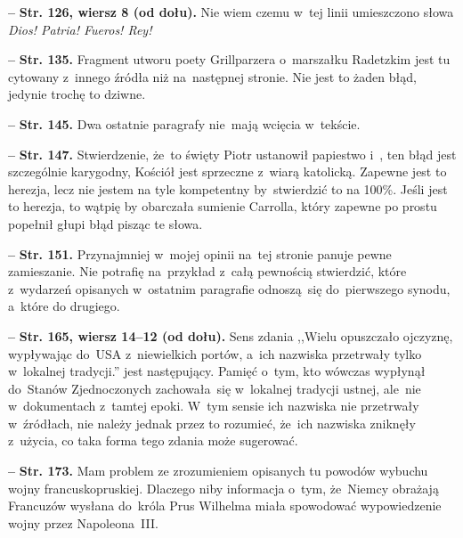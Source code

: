\documentclass[a4paper,11pt]{article}
\newcommand{\spaceFour}{0.5em}
\newcommand{\tb}{\textbf}
\newcommand{\noi}{\noindent}
\newcommand{\start}{\noi \tb{--} {}}
\newcommand{\Str}[1]{\tb{Str. #1.}}
\newcommand{\StrWd}[2]{\tb{Str. #1, wiersz #2 (od dołu).}}
\begin{document}
\vspace{\spaceFour}


\start \StrWd{126}{8} Nie wiem czemu w~tej linii umieszczono słowa
\emph{Dios! Patria! Fueros! Rey!}

\vspace{\spaceFour}


\start \Str{135} Fragment utworu poety Grillparzera o~marszałku
Radetzkim jest tu cytowany z~innego źródła niż na~następnej stronie.
Nie jest to żaden błąd, jedynie trochę to dziwne.

\vspace{\spaceFour}


\start \Str{145} Dwa ostatnie paragrafy nie~mają wcięcia w~tekście.

\vspace{\spaceFour}


\start \Str{147} Stwierdzenie, że~to święty Piotr ustanowił papiestwo
i~, ten błąd jest szczególnie karygodny, Kościół jest sprzeczne
z~wiarą katolicką. Zapewne jest to herezja, lecz nie jestem na tyle
kompetentny by~stwierdzić to na 100\%. Jeśli jest to herezja, to
wątpię by obarczała sumienie Carrolla, który zapewne po prostu
popełnił głupi błąd pisząc te słowa.

\vspace{\spaceFour}


\start \Str{151} Przynajmniej w~mojej opinii na~tej stronie panuje
pewne zamieszanie. Nie potrafię na~przykład z~całą pewnością
stwierdzić, które z~wydarzeń opisanych w~ostatnim paragrafie
odnoszą~się do~pierwszego synodu, a~które do drugiego.

\vspace{\spaceFour}


\start \StrWd{165}{14--12} Sens zdania ,,Wielu opuszczało ojczyznę,
wypływając do~USA z~niewielkich portów, a~ich nazwiska przetrwały
tylko w~lokalnej tradycji.'' jest następujący. Pamięć o~tym, kto
wówczas wypłynął do~Stanów Zjednoczonych zachowała~się w~lokalnej
tradycji ustnej, ale~nie w~dokumentach z~tamtej epoki. W~tym sensie
ich nazwiska nie przetrwały w~źródłach, nie należy jednak przez to
rozumieć, że~ich nazwiska zniknęły z~użycia, co taka forma tego zdania
może sugerować.

\vspace{\spaceFour}


\start \Str{173} Mam problem ze zrozumieniem opisanych tu powodów
wybuchu wojny francusko\dywiz pruskiej. Dlaczego niby informacja
o~tym, że~Niemcy obrażają Francuzów wysłana do~króla Prus Wilhelma
miała spowodować wypowiedzenie wojny przez Napoleona~III.
\end{document}
